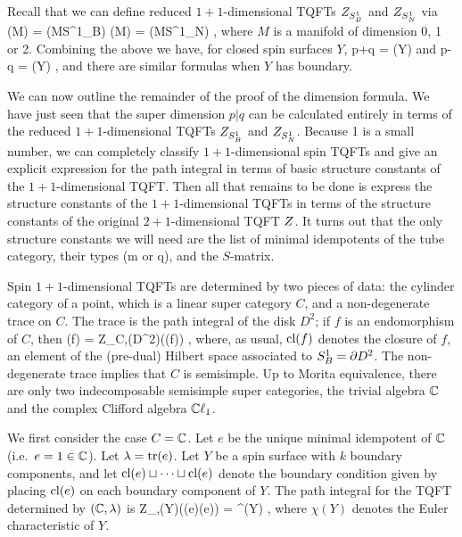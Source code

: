\medskip

Recall that we can define reduced $1{+}1$-dimensional TQFTs $Z_{S^1_B}$ and $Z_{S^1_N}$ via
\be
	\zob(M) = \ztt(M\times S^1_B) \quad\quad \zon(M) = \ztt(M\times S^1_N) ,
\ee
where $M$ is a manifold of dimension 0, 1 or 2.
Combining the above we have, for closed spin surfaces $Y$,
\be  \label{df5}
	p+q = \zob(Y)
\ee
and
\be  \label{df6}
	p-q = \zon(Y) ,
\ee
and there are similar formulas when $Y$ has boundary.

\medskip

We can now outline the remainder of the proof of the dimension formula.
We have just seen that the super dimension $p|q$ can be calculated entirely in terms of the reduced 
$1{+}1$-dimensional TQFTs $Z_{S^1_B}$ and $Z_{S^1_N}$.
Because 1 is a small number, we can completely classify $1{+}1$-dimensional spin TQFTs and give an explicit
expression for the path integral in terms of basic structure constants of the $1{+}1$-dimensional TQFT.
Then all that remains to be done is express the structure constants of the $1{+}1$-dimensional TQFTs in terms
of the structure constants of the original $2{+}1$-dimensional TQFT $Z$.
It turns out that the only structure constants we will need are the list of minimal idempotents of the tube category, 
their types (m or q), and the $S$-matrix.

\medskip

Spin $1{+}1$-dimensional TQFTs are determined by two pieces of data:
the cylinder category of a point, which is a linear super category $C$,
and a non-degenerate trace on $C$.
The trace is the path integral of the disk $D^2$; if $f$ is an endomorphism of $C$, then
\be
	\tr(f) = Z_{C,\tr}(D^2)(\cl(f)) ,
\ee
where, as usual, $\text{cl}(f)$ denotes the closure of $f$, an element of the (pre-dual) Hilbert space associated to $S^1_B = \partial D^2$.
The non-degenerate trace implies that $C$ is semisimple.
Up to Morita equivalence, there are only two indecomposable semisimple super categories, the 
trivial algebra $\mathbb{C}$ and the complex Clifford algebra $\mathbb{C}\ell_1$.

We first consider the case $C = \mathbb{C}$.
Let $e$ be the unique minimal idempotent of $\mathbb{C}$ (i.e.\ $e = 1\in \mathbb{C}$).
Let $\lambda = \text{tr}(e)$.
Let $Y$ be a spin surface with $k$ boundary components, and let
$\text{cl}(e)\sqcup\cdots\sqcup \text{cl}(e)$ denote the boundary condition given by placing $\text{cl}(e)$ on each boundary component of $Y$.
The path integral for the TQFT determined by $(\mathbb{C}, \lambda)$ is
\be  \label{zc_ans}
	Z_{\cc,\lambda}(Y)(\cl(e)\du\cdots\du \cl(e)) = \lambda^{\chi(Y)} ,
\ee
where $\chi(Y)$ denotes the Euler characteristic of $Y$.


